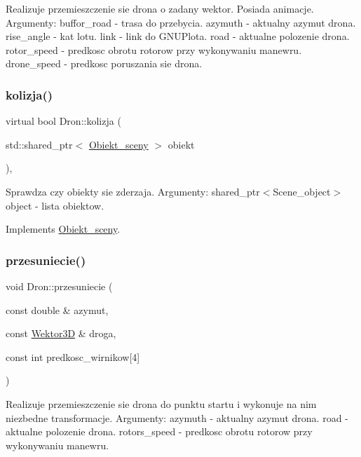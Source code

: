 Realizuje przemieszczenie sie drona o zadany wektor. Posiada animacje. Argumenty\+: buffor\+\_\+road -\/ trasa do przebycia. azymuth -\/ aktualny azymut drona. rise\+\_\+angle -\/ kat lotu. link -\/ link do G\+N\+U\+Plota. road -\/ aktualne polozenie drona. rotor\+\_\+speed -\/ predkosc obrotu rotorow przy wykonywaniu manewru. drone\+\_\+speed -\/ predkosc poruszania sie drona. \mbox{\label{class_dron_a4cfd8ccac2031912be001b445e91e7e5}} 
\subsubsection{\texorpdfstring{kolizja()}{kolizja()}}
{\footnotesize\ttfamily virtual bool Dron\+::kolizja (\begin{DoxyParamCaption}\item[{std\+::shared\+\_\+ptr$<$ \mbox{\hyperlink{class_obiekt__sceny}{Obiekt\+\_\+sceny}} $>$}]{obiekt }\end{DoxyParamCaption})\hspace{0.3cm}{\ttfamily [inline]}, {\ttfamily [virtual]}}

Sprawdza czy obiekty sie zderzaja. Argumenty\+: shared\+\_\+ptr$<$\+Scene\+\_\+object$>$ object -\/ lista obiektow. 

Implements \mbox{\hyperlink{class_obiekt__sceny}{Obiekt\+\_\+sceny}}.

\mbox{\label{class_dron_adccff890ab21226c99d3707ca5070d40}} 
\subsubsection{\texorpdfstring{przesuniecie()}{przesuniecie()}}
{\footnotesize\ttfamily void Dron\+::przesuniecie (\begin{DoxyParamCaption}\item[{const double \&}]{azymut,  }\item[{const \mbox{\hyperlink{class_wektor}{Wektor3D}} \&}]{droga,  }\item[{const int}]{predkosc\+\_\+wirnikow\mbox{[}4\mbox{]} }\end{DoxyParamCaption})\hspace{0.3cm}{\ttfamily [inline]}}

Realizuje przemieszczenie sie drona do punktu startu i wykonuje na nim niezbedne transformacje. Argumenty\+: azymuth -\/ aktualny azymut drona. road -\/ aktualne polozenie drona. rotors\+\_\+speed -\/ predkosc obrotu rotorow przy wykonywaniu manewru. \mbox{\label{class_dron_a0ea228f96898dc3b6faa6849636333f3}} 
